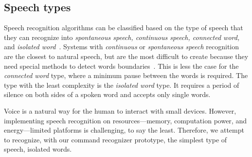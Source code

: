 \subsection {Speech types}
%
Speech recognition algorithms can be classified based on the type of speech that they can recognize into \textit{spontaneous speech, continuous speech, connected word,} and \textit{isolated word}~\cite{gaikwad2010review}.
Systems with \textit{continuous} or \textit{spontaneous speech} recognition are the closest to natural speech, but are the most difficult to create because they need special methods to detect words boundaries~\cite{gaikwad2010review}. This is less the case for the \textit{connected word} type, where a minimum pause between the words is required.
 The type with the least complexity is the \textit{isolated word} type. It requires a period of silence on both sides of a spoken word and accepts only single words. 
 
Voice is a natural way for the human to interact with small devices. However,
implementing speech recognition on resources---memory, computation power, and energy---limited platforms is challenging, to say the least. Therefore, we attempt to recognize, with our command recognizer prototype, the simplest type of speech, isolated words. 